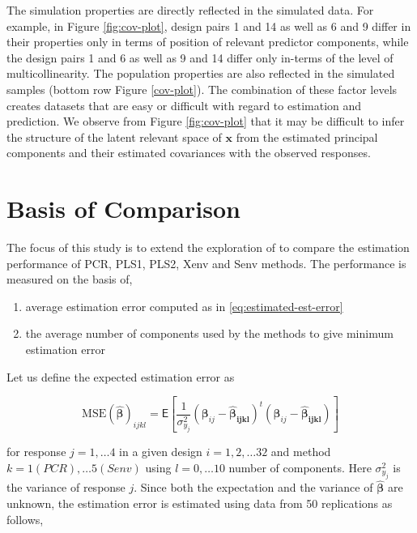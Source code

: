 \documentclass[12pt,3p,authoryear]{elsarticle}
\providecommand{\tightlist}{%
  \setlength{\itemsep}{0pt}\setlength{\parskip}{0pt}}
\begin{document}
The simulation properties are directly reflected in the simulated data.
For example, in Figure \ref{fig:cov-plot}, design pairs 1 and 14 as well
as 6 and 9 differ in their properties only in terms of position of
relevant predictor components, while the design pairs 1 and 6 as well as
9 and 14 differ only in-terms of the level of multicollinearity. The
population properties are also reflected in the simulated samples
(bottom row Figure \ref{cov-plot}). The combination of these factor
levels creates datasets that are easy or difficult with regard to
estimation and prediction. We observe from Figure \ref{fig:cov-plot}
that it may be difficult to infer the structure of the latent relevant
space of \(\mathbf{x}\) from the estimated principal components and
their estimated covariances with the observed responses.

\section{Basis of Comparison}\label{basis-of-comparison}

The focus of this study is to extend the exploration of
\citet{rimal2019pred} to compare the estimation performance of PCR,
PLS1, PLS2, Xenv and Senv methods. The performance is measured on the
basis of,

\begin{enumerate}
\def\labelenumi{\alph{enumi})}
\tightlist
\item
  average estimation error computed as in \eqref{eq:estimated-est-error}
\item
  the average number of components used by the methods to give minimum
  estimation error
\end{enumerate}

Let us define the expected estimation error as

\begin{equation}
  \text{MSE}\left(
    \widehat{\boldsymbol{\beta}}
  \right)_{ijkl} =
  \mathsf{E}{\left[
    \frac{1}{\sigma_{y_j}^2}\left(
      \boldsymbol{\beta}_{ij} - \boldsymbol{\widehat{\beta}_{ijkl}}
    \right)^t
    \left(
      \boldsymbol{\beta}_{ij} - \boldsymbol{\widehat{\beta}_{ijkl}}
    \right)
  \right]}
\label{eq:est-error}
\end{equation}

for response \(j = 1, \ldots 4\) in a given design \(i=1, 2, \ldots 32\)
and method \(k=1(PCR), \ldots 5(Senv)\) using \(l=0, \ldots 10\) number
of components. Here \(\sigma_{y_j}^2\) is the variance of response
\(j\). Since both the expectation and the variance of
\(\widehat{\boldsymbol{\beta}}\) are unknown, the estimation error is
estimated using data from 50 replications as follows,
\end{document}
